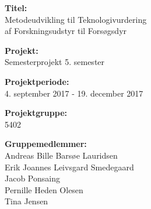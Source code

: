 \begin{minipage}[t]{0.48\textwidth}
\textbf{Titel:} %
\\\hspace*{2ex} 
Metodeudvikling til Teknologivurdering \\\hspace*{2ex} 
af Forskningsudstyr til Forsøgsdyr\\\hspace*{2ex} 

\textbf{Projekt:} %
\\\hspace*{2ex}
Semesterprojekt 5. semester \\\hspace*{2ex}

\textbf{Projektperiode:} %
\\\hspace*{2ex}
4. september 2017 - 19. december 2017 \\\hspace*{2ex}

\textbf{Projektgruppe:} %
\\\hspace*{2ex}
5402\\\hspace*{2ex}

\textbf{Gruppemedlemmer:} %
\\\hspace*{2ex}
Andreas Bille Barsøe Lauridsen \\\hspace*{2ex}
Erik Joannes Leivsgard Smedegaard\\\hspace*{2ex}
Jacob Ponsaing\\\hspace*{2ex}
Pernille Heden Olesen\\\hspace*{2ex}
Tina Jensen\\\hspace*{2ex}




\end{minipage}
